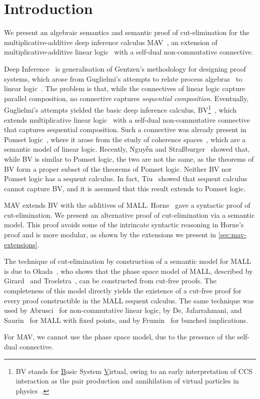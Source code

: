 \section{Introduction}\label{sec:introduction}

We present an algebraic semantics and semantic proof of cut-elimination for the multiplicative-additive deep inference calculus MAV~\cite{Horne15:mav}, an extension of multiplicative-additive linear logic~\cite[MALL]{Girard87:ll} with a self-dual non-commutative connective.

Deep Inference~\cite{Guglielmi14:di} is generalisation of Gentzen's methodology for designing proof systems, which arose from Guglielmi's attempts to relate process algebras~\cite[CCS]{Milner80:CCS,Milner89:CC} to linear logic~\cite{Girard87:ll}.
The problem is that, while the connectives of linear logic capture parallel composition, no connective captures \emph{sequential composition}.
Eventually, Guglielmi's attempts yielded the basic deep inference calculus, BV\footnote{
      BV stands for \underline{B}asic System \underline{V}irtual, owing to an early interpretation of CCS interaction as the pair production and annihilation of virtual particles in physics~\cite[]{Horne15:mav}.
}~\cite{Guglielmi99:bv,Guglielmi07:sis}, which extends multiplicative linear logic~\cite[MLL]{Girard87:ll} with a self-dual non-commutative connective that captures sequential composition.
Such a connective was already present in Pomset logic~\cite{Retore97:pomset}, where it arose from the study of coherence spaces~\cite[]{GirardTL89:proofs}, which are a semantic model of linear logic.
Recently, Nguyễn and Stra{\ss}burger~\cite{NguyenS22:bvisnotpl} showed that, while BV is similar to Pomset logic, the two are not the same, as the theorems of BV form a proper subset of the theorems of Pomset logic.
Neither BV nor Pomset logic has a sequent calculus. In fact, Tiu~\cite{Tiu06:sisii} showed that sequent calculus cannot capture BV, and it is assumed that this result extends to Pomset logic.

MAV extends BV with the additives of MALL. Horne~\cite{Horne15:mav} gave a syntactic proof of cut-elimination. We present an alternative proof of cut-elimination via a semantic model. This proof avoids some of the intrincate syntactic reasoning in Horne's proof and is more modular, as shown by the extensions we present in \cref{sec:mav-extensions}.

The technique of cut-elimination by construction of a semantic model for MALL is due to Okada~\cite{Okada99:psc}, who shows that the phase space model of MALL, described by Girard~\cite[\S4.1]{Girard87:ll} and Troelstra~\cite[]{Troelstra92:lll}, can be constructed from cut-free proofs.
The completeness of this model directly yields the existence of a cut-free proof for every proof constructible in the MALL sequent calculus.
The same technique was used by Abrusci~\cite{Abrusci91:psc} for non-commutative linear logic, by De, Jafarrahmani, and Saurin~\cite{De22:psc} for MALL with fixed points, and by Frumin~\cite{Frumin22:psc} for bunched implications.

For MAV, we cannot use the phase space model, due to the presence of the self-dual connective.
